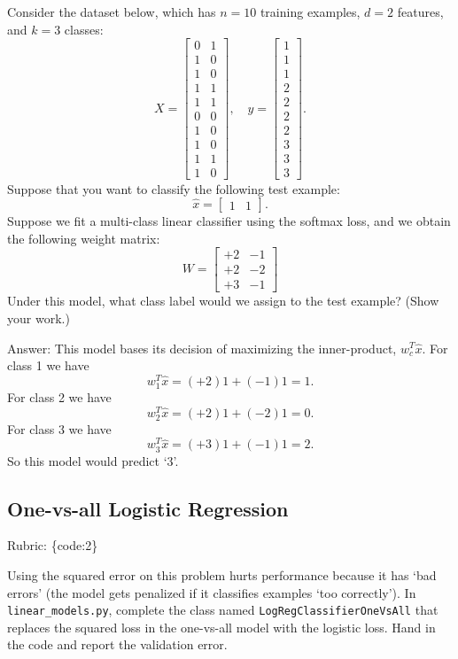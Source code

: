\documentclass{article}
\def\ans#1{\par\gre{Answer: #1}}
\def\answer#1{\ans{#1}}
\def\rubric#1{\gre{Rubric: \{#1\}}}{}
\def\blu#1{{\color{blu}#1}}
\def\gre#1{{\color{gre}#1}}
\begin{document}
Consider the dataset below, which has $n=10$ training examples, $d=2$ features, and $k=3$ classes:
\[
X = \begin{bmatrix}0 & 1\\1 & 0\\ 1 & 0\\ 1 & 1\\ 1 & 1\\ 0 & 0\\  1 & 0\\  1 & 0\\  1 & 1\\  1 &0\end{bmatrix}, \quad y = \begin{bmatrix}1\\1\\1\\2\\2\\2\\2\\3\\3\\3\end{bmatrix}.
\]
Suppose that you want to classify the following test example:
\[
\hat{x} = \begin{bmatrix}1 & 1\end{bmatrix}.
\]
Suppose we fit a multi-class linear classifier using the softmax loss, and we obtain the following weight matrix:
\[
W =
\begin{bmatrix}
+2 & -1\\
+2 & -2\\
+3 & -1
\end{bmatrix}
\]
\blu{Under this model, what class label would we assign to the test example? (Show your work.)}


\answer{
This model bases its decision of maximizing the inner-product, $w_c^T\hat{x}$.
For class 1 we have
\[
w_1^T\hat{x} = (+2)1 + (-1)1 = 1.
\]
For class 2 we have
\[
w_2^T\hat{x} = (+2)1 + (-2)1 = 0.
\]
For class 3 we have
\[
w_3^T\hat{x} = (+3)1 + (-1)1 = 2.
\]
So this model would predict `3'.
}


\subsection{One-vs-all Logistic Regression}
\rubric{code:2}

Using the squared error on this problem hurts performance because it has `bad errors' (the model gets penalized if it classifies examples `too correctly'). In \texttt{linear\_models.py}, complete the class named \texttt{LogRegClassifierOneVsAll} that replaces the squared loss in the one-vs-all model with the logistic loss. \blu{Hand in the code and report the validation error}.
\end{document}
